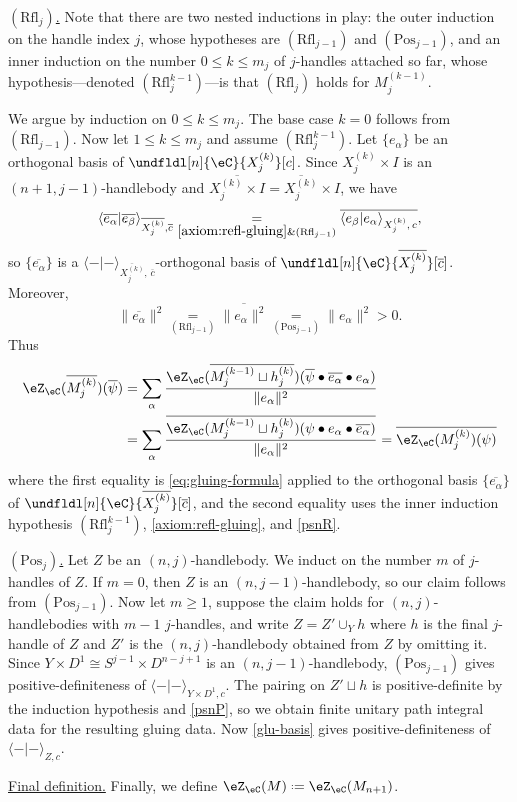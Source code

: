 \documentclass[12pt,reqno]{amsart}
\newcounter{alpha}\renewcommand\thealpha{\upshape\Alph{alpha}}
\newcommand{\C}{\eC}
\newcommand{\Z}{\eZ}
\newcommand{\blt}{\bullet}
\newcommand{\fcj}[1]{\overline{#1}}
\newcommand{\orev}{\overline}
\newcommand{\bkt}[2]{\langle #1|#2 \rangle}
\newcommand{\itemstep}[1]{\smallskip\noindent\underline{#1}}
\renewcommand{\amalg}{\sqcup}
\DeclareRobustCommand{\coloneq}{\mathrel{\vcenter{\baselineskip0.5ex\lineskiplimit0pt\hbox{\scriptsize{\upshape.}}\hbox{\scriptsize{\upshape.}}}}=}
\begin{document}
\begin{construction}
\itemstep{$(\mathrm{Rfl}_j)$.}
Note that there are two nested inductions in play: the outer induction on the handle index $j$, whose hypotheses are $(\mathrm{Rfl}_{j-1})$ and $(\mathrm{Pos}_{j-1})$, and an inner induction on the number $0\leq k\leq m_j$ of $j$-handles attached so far, whose hypothesis---denoted $(\mathrm{Rfl}_j^{k-1})$---is that $(\mathrm{Rfl}_j)$ holds for $M_j^{(k-1)}$.

We argue by induction on $0\leq k\leq m_j$. The base case $k=0$ follows from $(\mathrm{Rfl}_{j-1})$. Now let $1\leq k\leq m_j$ and assume $(\mathrm{Rfl}_j^{k-1})$. Let $\{e_\alpha\}$ be an orthogonal basis of $\undfldl[n]{\C}{X_j^{(k)}}[c]$. Since $X_j^{(k)}\times I$ is an $(n+1,j-1)$-handlebody and $\orev{X_j^{(k)}\times I}=\orev{X_j^{(k)}}\times I$, we have
\[
\bkt{\fcj{e_\alpha}}{\fcj{e_\beta}}_{\orev{X_j^{(k)}},\fcj c}
\underset{\ref{axiom:refl-gluing}\&(\mathrm{Rfl}_{j-1})}=
\overline{\bkt{e_\beta}{e_\alpha}_{X_j^{(k)},\,c}},
\]
so $\{\fcj{e_\alpha}\}$ is a $\bkt--_{\orev{X_j^{(k)}},\,\fcj c}$-orthogonal basis of $\undfldl[n]{\C}{\orev{X_j^{(k)}}}[\fcj c]$. Moreover,
\[
\|\fcj{e_\alpha}\|^2\underset{(\mathrm{Rfl}_{j-1})}{=}\overline{\|e_\alpha\|^2}\underset{(\mathrm{Pos}_{j-1})}{=}\|e_\alpha\|^2>0.
\]
Thus
\[
\begin{aligned}
\Z_\C(\orev{M_j^{(k)}})(\fcj\psi)
&=
\sum_\alpha
\frac{\Z_\C(\orev{M_j^{(k-1)}\amalg h_j^{(k)}})
(\fcj\psi\blt\fcj{e_\alpha}\blt e_\alpha)}
{\|e_\alpha\|^2}
\\
&=
\sum_\alpha
\frac{\overline{\Z_\C(M_j^{(k-1)}\amalg h_j^{(k)})
(\psi\blt e_\alpha\blt\fcj{e_\alpha})}}
{\|e_\alpha\|^2}
=
\overline{\Z_\C(M_j^{(k)})(\psi)}
\end{aligned}
\]
where the first equality is \eqref{eq:gluing-formula} applied to the orthogonal basis $\{\fcj{e_\alpha}\}$ of $\undfldl[n]{\C}{\orev{X_j^{(k)}}}[\fcj c]$, and the second equality uses the inner induction hypothesis $(\mathrm{Rfl}_j^{k-1})$, \ref{axiom:refl-gluing}, and
\ref{psnR}. 

\itemstep{$(\mathrm{Pos}_j)$.}
Let $Z$ be an $(n,j)$-handlebody. We induct on the number $m$ of $j$-handles of $Z$. If $m=0$, then $Z$ is an $(n,j-1)$-handlebody, so our claim follows from $(\mathrm{Pos}_{j-1})$. Now let $m\geq 1$, suppose the claim holds for $(n,j)$-handlebodies with $m-1$ $j$-handles, and write $Z=Z'\cup_Yh$ where $h$ is the final $j$-handle of $Z$ and $Z'$ is the $(n,j)$-handlebody obtained from $Z$ by omitting it. Since $Y\times D^1\cong S^{j-1}\times D^{n-j+1}$ is an $(n,j-1)$-handlebody, $(\mathrm{Pos}_{j-1})$ gives positive-definiteness of $\bkt--_{Y\times D^1,c}$. The pairing on $Z'\amalg h$ is positive-definite by the induction hypothesis and \ref{psnP}, so we obtain finite unitary path integral data for the resulting gluing data. Now \cref{glu-basis} gives
positive-definiteness of $\bkt--_{Z,c}$.

\itemstep{Final definition.}
Finally, we define $\Z_\C(M)\coloneq\Z_\C(M_{n+1})$.
\end{construction}
\end{document}
